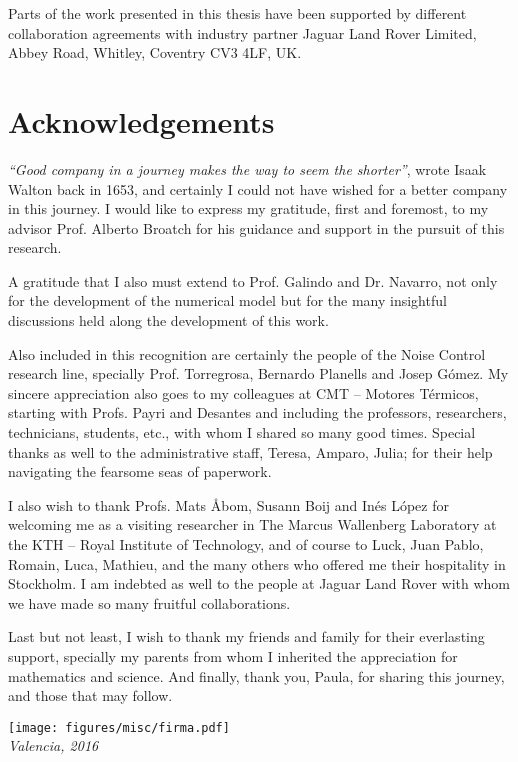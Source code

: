 \documentclass[final,twoside,11pt]{book}
\makeatletter
\numberwithin{equation}{section}
\numberwithin{figure}{chapter}
\numberwithin{table}{chapter}
\def\cleardoublepage{\clearpage\if@twoside \ifodd\c@page\else
  \hbox{}
  \thispagestyle{empty}
  \newpage
  \if@twocolumn\hbox{}\newpage\fi\fi\fi}
\makeatother
\begin{document}
Parts of the work presented in this thesis have been supported by different collaboration agreements with industry partner Jaguar Land Rover Limited, Abbey Road, Whitley, Coventry CV3 4LF, UK. 

\cleardoublepage

\chapter*{Acknowledgements}
\enlargethispage{15mm}
\textit{``Good company in a journey makes the way to seem the shorter''}, wrote Isaak Walton back in 1653, and certainly I could not have wished for a better company in this journey. I would like to express my gratitude, first and foremost, to my advisor Prof. Alberto Broatch for his guidance and support in the pursuit of this research.

A gratitude that I also must extend to Prof. Galindo and Dr. Navarro, not only for the development of the numerical model but for the many insightful discussions held along the development of this work.

Also included in this recognition are certainly the people of the Noise Control research line, specially Prof. Torregrosa, Bernardo Planells and Josep Gómez. My sincere appreciation also goes to my colleagues at CMT -- Motores Térmicos, starting with Profs. Payri and Desantes and including the professors, researchers, technicians, students, etc., with whom I shared so many good times. Special thanks as well to the administrative staff, Teresa, Amparo, Julia; for their help navigating the fearsome seas of paperwork.

I also wish to thank Profs. Mats Åbom, Susann Boij and Inés López for welcoming me as a visiting researcher in The Marcus Wallenberg Laboratory at the KTH -- Royal Institute of Technology, and of course to Luck, Juan Pablo, Romain, Luca, Mathieu, and the many others who offered me their hospitality in Stockholm. I am indebted as well to the people at Jaguar Land Rover with whom we have made so many fruitful collaborations.

Last but not least, I wish to thank my friends and family for their everlasting support, specially my parents from whom I inherited the appreciation for mathematics and science. And finally, thank you, Paula, for sharing this journey, and those that may follow.\\[-1mm]

\hspace{0.72\textwidth}
\begin{minipage}[t]{0.3\textwidth}
\texttt{[image: figures/misc/firma.pdf]}\\[0mm]
\null\cabin\itshape\small\hspace{5mm} Valencia, 2016
\end{minipage}
\end{document}
